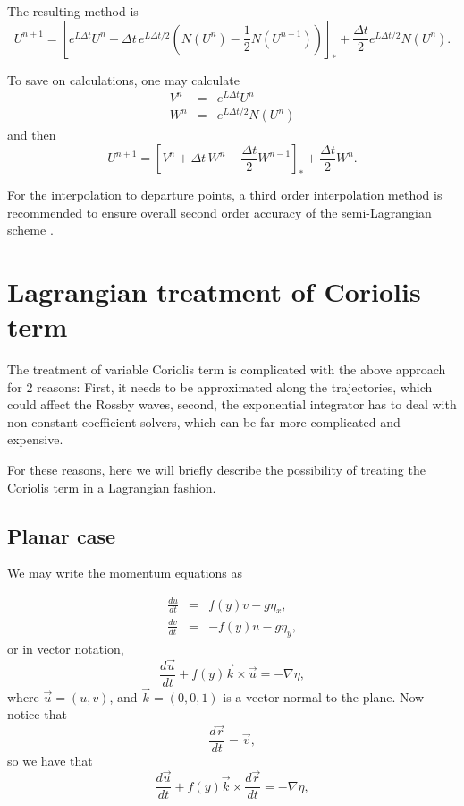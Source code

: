 \documentclass[10pt,a4paper]{article}
\begin{document}
The resulting method is 
\begin{equation}
U^{n+1}=\left[e^{L \Delta t} U^n+\Delta t\,e^{L\Delta t/2}\left( N(U^n)- \frac{1}{2}N(U^{n-1})\right) \right]_*+\frac{\Delta t}{2}e^{L\Delta t/2}N(U^n).
\end{equation}

To save on calculations, one may calculate
\begin{eqnarray}
V^n&=&e^{L \Delta t} U^n \\
W^n&=&e^{L \Delta t/2} N(U^n)
\end{eqnarray}
and then
\begin{equation}
U^{n+1}=\left[V^n+\Delta t\,W^n - \frac{\Delta t}{2}W^{n-1} \right]_*+\frac{\Delta t}{2}W^n.
\end{equation}

For the interpolation to departure points, a third order interpolation method is recommended to ensure overall second order accuracy of the semi-Lagrangian scheme \cite{Peixoto2014}.
%
%

\section{Lagrangian treatment of Coriolis term}

The treatment of variable Coriolis term is complicated with the above approach for 2 reasons: First, it needs to be approximated along the trajectories, which could affect the Rossby waves, second, the exponential integrator has to deal with non constant coefficient solvers, which can be far more complicated and expensive.

For these reasons, here we will briefly describe the possibility of treating the Coriolis term in a Lagrangian fashion.

\subsection{Planar case}
We may write the momentum equations as

\begin{eqnarray}
\frac{du}{dt}&=&  f(y)v -g\eta_x,\\
\frac{dv}{dt} &=& -f(y)u- g\eta_y, 
\end{eqnarray}
or in vector notation,
\begin{equation}
\frac{d\vec{u}}{dt}+f(y)\vec{k}\times\vec{u}=-\nabla \eta, 
\end{equation}
where $\vec{u}=(u,v)$, and $\vec{k}=(0,0,1)$ is a vector normal to the plane. Now notice that 
\begin{equation}
\frac{d \vec{r}}{dt} = \vec{v},
\end{equation}
so we have that
\begin{equation}
\frac{d\vec{u}}{dt}+f(y)\vec{k}\times\frac{d \vec{r}}{dt}=-\nabla \eta, 
\end{equation}
\end{document}
